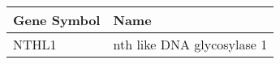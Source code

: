 \begin{tabular}{ll}
\toprule
Gene Symbol &                       Name \\
\midrule
      NTHL1 & nth like DNA glycosylase 1 \\
\bottomrule
\end{tabular}
